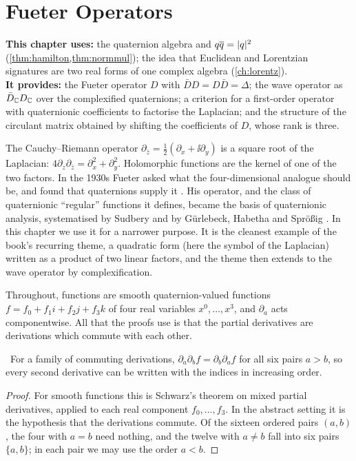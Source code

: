 \chapter{Fueter Operators}
\label{ch:fueter}

\begin{usesbox}
\textbf{This chapter uses:} the quaternion algebra and $q\overline{q}=|q|^2$ (\cref{thm:hamilton,thm:normmul}); the idea that Euclidean and Lorentzian signatures are two real forms of one complex algebra (\cref{ch:lorentz}).\\
\textbf{It provides:} the Fueter operator $D$ with $\bar DD=D\bar D=\Delta$; the wave operator as $\bar D_{\mathbb{C}}D_{\mathbb{C}}$ over the complexified quaternions; a criterion for a first-order operator with quaternionic coefficients to factorise the Laplacian; and the structure of the circulant matrix obtained by shifting the coefficients of $D$, whose rank is three.
\end{usesbox}

The Cauchy--Riemann operator $\partial_{\bar z}=\frac12(\partial_x+\ii\partial_y)$ is a square root of the Laplacian: $4\partial_z\partial_{\bar z}=\partial_x^2+\partial_y^2$. Holomorphic functions are the kernel of one of the two factors. In the 1930s Fueter asked what the four-dimensional analogue should be, and found that quaternions supply it \cite{Fueter1934}. His operator, and the class of quaternionic ``regular'' functions it defines, became the basis of quaternionic analysis, systematised by Sudbery \cite{Sudbery1979} and by Gürlebeck, Habetha and Spr\"o\ss ig \cite{GHS}. In this chapter we use it for a narrower purpose. It is the cleanest example of the book's recurring theme, a quadratic form (here the symbol of the Laplacian) written as a product of two linear factors, and the theme then extends to the wave operator by complexification.

Throughout, functions are smooth quaternion-valued functions $f=f_0+f_1i+f_2j+f_3k$ of four real variables $x^0,\dots,x^3$, and $\partial_a$ acts componentwise. All that the proofs use is that the partial derivatives are derivations which commute with each other.

\begin{lemma}\label{lem:commute}\ver\
For a family of commuting derivations, $\partial_a\partial_b f=\partial_b\partial_a f$ for all six pairs $a>b$, so every second derivative can be written with the indices in increasing order.
\end{lemma}
\begin{proof}
For smooth functions this is Schwarz's theorem on mixed partial derivatives, applied to each real component $f_0,\dots,f_3$. In the abstract setting it is the hypothesis that the derivations commute. Of the sixteen ordered pairs $(a,b)$, the four with $a=b$ need nothing, and the twelve with $a\ne b$ fall into six pairs $\{a,b\}$; in each pair we may use the order $a<b$.
\end{proof}


